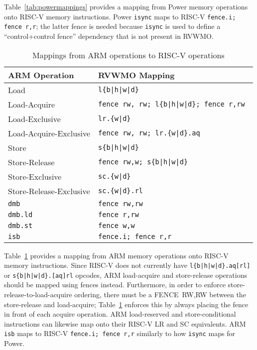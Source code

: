 Table~\ref{tab:powermappings} provides a mapping from Power memory operations onto RISC-V memory instructions.
Power {\tt isync} maps to RISC-V {\tt fence.i; fence r,r}; the latter fence is needed because {\tt isync} is used to define a ``control+control fence'' dependency that is not present in RVWMO.

\begin{table}[h!]
  \centering
  \begin{tabular}{|l|l|}
    \hline
    ARM Operation             & RVWMO Mapping \\
    \hline
    \hline
    Load                      & \tt l\{b|h|w|d\}  \\
    \hline
    Load-Acquire              & \tt fence rw, rw; l\{b|h|w|d\}; fence r,rw  \\
    \hline
    Load-Exclusive            & \tt lr.\{w|d\}  \\
    \hline
    Load-Acquire-Exclusive    & \tt fence rw, rw; lr.\{w|d\}.aq \\
    \hline
    Store                     & \tt s\{b|h|w|d\}  \\
    \hline
    Store-Release             & \tt fence rw,w; s\{b|h|w|d\}  \\
    \hline
    Store-Exclusive           & \tt sc.\{w|d\}  \\
    \hline
    Store-Release-Exclusive   & \tt sc.\{w|d\}.rl  \\
    \hline
    \tt dmb                   & \tt fence rw,rw \\
    \hline
    \tt dmb.ld                & \tt fence r,rw \\
    \hline
    \tt dmb.st                & \tt fence w,w \\
    \hline
    \tt isb                   & \tt fence.i; fence r,r \\
    \hline
  \end{tabular}
  \caption{Mappings from ARM operations to RISC-V operations}
  \label{tab:armmappings}
\end{table}

Table~\ref{tab:armmappings} provides a mapping from ARM memory operations onto RISC-V memory instructions.
Since RISC-V does not currently have {\tt l\{b|h|w|d\}.aq[rl]} or  {\tt s\{b|h|w|d\}.[aq]rl} opcodes, ARM load-acquire and store-release operations should be mapped using fences instead.
Furthermore, in order to enforce store-release-to-load-acquire ordering, there must be a FENCE~RW,RW between the store-release and load-acquire; Table~\ref{tab:armmappings} enforces this by always placing the fence in front of each acquire operation.
ARM load-reserved and store-conditional instructions can likewise map onto their RISC-V LR and SC equivalents.
ARM {\tt isb} maps to RISC-V {\tt fence.i;~fence~r,r} similarly to how {\tt isync} maps for Power.

